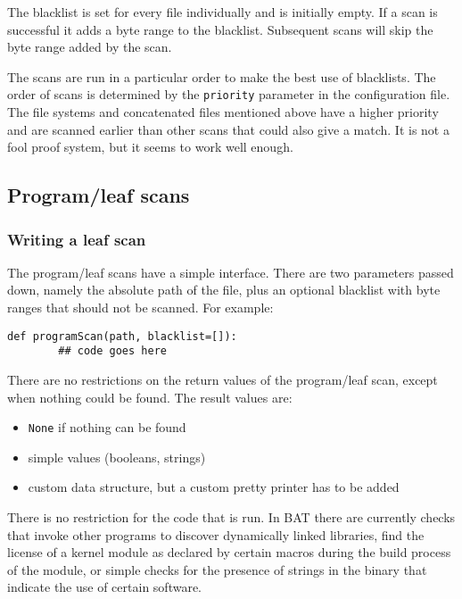 \documentclass[10pt]{article}
\begin{document}
The blacklist is set for every file individually and is initially empty. If a
scan is successful it adds a byte range to the blacklist. Subsequent scans
will skip the byte range added by the scan.

The scans are run in a particular order to make the best use of blacklists. The
order of scans is determined by the \texttt{priority} parameter in the
configuration file. The file systems and concatenated files mentioned above
have a higher priority and are scanned earlier than other scans that could also
give a match. It is not a fool proof system, but it seems to work well enough.

\subsection{Program/leaf scans}

\subsubsection{Writing a leaf scan}

The program/leaf scans have a simple interface. There are two parameters
passed down, namely the absolute path of the file, plus an optional blacklist
with byte ranges that should not be scanned. For example:

\begin{verbatim}
def programScan(path, blacklist=[]):
        ## code goes here
\end{verbatim}

There are no restrictions on the return values of the program/leaf scan, except
when nothing could be found. The result values are:

\begin{itemize}
\item \texttt{None} if nothing can be found
\item simple values (booleans, strings)
\item custom data structure, but a custom pretty printer has to be added
\end{itemize}

There is no restriction for the code that is run. In BAT there are currently
checks that invoke other programs to discover dynamically linked libraries,
find the license of a kernel module as declared by certain macros during the
build process of the module, or simple checks for the presence of strings in
the binary that indicate the use of certain software.
\end{document}
